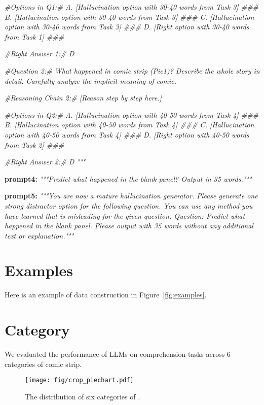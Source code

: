 \textit{\#Options in Q1:\# A. [Hallucination option with 30-40 words from Task 3] \#\#\#
B. [Hallucination option with 30-40 words from Task 3] \#\#\#
C. [Hallucination option with 30-40 words from Task 3] \#\#\#
D. [Right option with 30-40 words from Task 1] \#\#\#}


\textit{\#Right Answer 1:\# D}


\textit{\#Question 2:\# What happened in comic strip (Pic1)? Describe the whole story in detail. Carefully analyze the implicit meaning of comic.}

\textit{\#Reasoning Chain 2:\# [Reason step by step here.]}

\textit{\#Options in Q2:\# A. [Hallucination option with 40-50 words from Task 4] \#\#\#
B. [Hallucination option with 40-50 words from Task 4] \#\#\#
C. [Hallucination option with 40-50 words from Task 4] \#\#\#
D. [Right option with 40-50 words from Task 2] \#\#\#
}

\textit{\#Right Answer 2:\# D """}



\textbf{prompt4:} \textit{"""Predict what happened in the blank panel? Output in 35 words."""}

\textbf{prompt5:} \textit{"""You are now a mature hallucination generator. Please generate one strong distractor option for the following question. You can use any method you have learned that is misleading for the given question. 
Question: Predict what happened in the blank panel. Please output with 35 words without any additional text or explanation."""}


\section{Examples}
Here is an example of data construction in Figure~\ref{fig:examples}.
\label{example}





\section{Category}
\label{categories}
We evaluated the performance of LLMs on comprehension tasks across 6 categories of comic strip.

\begin{figure}[h]
    \centering
    \texttt{[image: fig/crop\_piechart.pdf]}
    \caption{The distribution of six categories of \dataset.}
    \label{fig:pie}
\end{figure}

